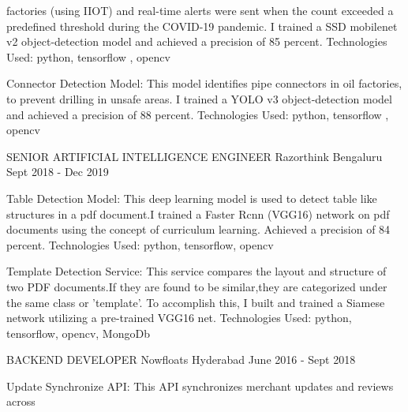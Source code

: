 \begin{cventries}
{\begin{cvitems}
{      factories (using IIOT) and real-time alerts were sent when the count exceeded a predefined threshold during the 
      COVID-19 pandemic. I trained a SSD mobilenet v2 object-detection model and achieved a precision of 85 percent. 
      Technologies Used: python, tensorflow , opencv }
      \item{Connector Detection Model: This model identifies pipe connectors 
      in oil factories, to prevent drilling in unsafe areas. I trained a 
      YOLO v3 object-detection model and achieved a precision of 88 percent. 
      Technologies Used: python, tensorflow , opencv}
	\end{cvitems}
    }
\vspace{2em} %
  \cventry
    {SENIOR ARTIFICIAL INTELLIGENCE ENGINEER} %
    {Razorthink} %
    {Bengaluru} %
    {Sept 2018 - Dec 2019} %
    {
      \begin{cvitems} %
        \item{Table Detection Model: This deep learning model is used to 
        detect table like structures in a pdf document.I trained a Faster Rcnn (VGG16) 
        network on pdf documents using the concept of curriculum learning. Achieved a 
        precision of 84 percent. 
        Technologies Used: python, tensorflow, opencv}        
        \item{Template Detection Service: This service compares the layout and 
        structure of two PDF documents.If they are found to be similar,they 
        are categorized under the same class or ’template’. To accomplish this, 
        I built and trained a Siamese network utilizing a pre-trained VGG16 net. 
        Technologies Used: python, tensorflow, opencv, MongoDb}        
	\end{cvitems}
    }
\vspace{2em} %
  \cventry
    {BACKEND DEVELOPER} %
    {Nowfloats} %
    {Hyderabad} %
    {June 2016 - Sept 2018} %
    {
      \begin{cvitems} %
        \item {Update Synchronize API: This API synchronizes merchant updates and reviews across 
}
\end{cvitems}}
\end{cventries}
